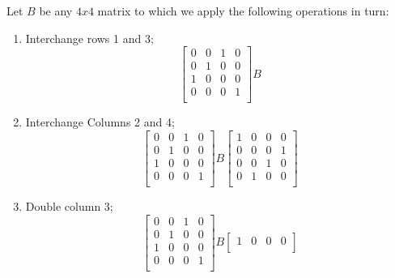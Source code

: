 \documentclass[12pt]{article}
\makeatletter
\theoremstyle{homework}
\newenvironment{exercise}[1]
{\def\@currentlabel{#1}\exercisecore}
{\endexercisecore}
\makeatother
\begin{document}
\begin{exercise}{4} Let $B$ be any $4x4$ matrix to which we apply the following operations in turn:
    \begin{enumerate}
        \item Interchange rows 1 and 3;
        \begin{equation*}
            \begin{bmatrix}
                0 & 0 & 1 & 0\\
                0 & 1 & 0 & 0\\
                1 & 0 & 0 & 0\\
                0 & 0 & 0 & 1\\
            \end{bmatrix}
            B
        \end{equation*}
        \item Interchange Columns 2 and 4;
        \begin{equation*}
            \begin{bmatrix}
                0 & 0 & 1 & 0\\
                0 & 1 & 0 & 0\\
                1 & 0 & 0 & 0\\
                0 & 0 & 0 & 1\\
            \end{bmatrix}
            B
            \begin{bmatrix}
                1 & 0 & 0 & 0\\
                0 & 0 & 0 & 1\\
                0 & 0 & 1 & 0\\
                0 & 1 & 0 & 0\\
            \end{bmatrix}
        \end{equation*}
        \item Double column 3;
        \begin{equation*}
            \begin{bmatrix}
                0 & 0 & 1 & 0\\
                0 & 1 & 0 & 0\\
                1 & 0 & 0 & 0\\
                0 & 0 & 0 & 1\\
            \end{bmatrix}
            B
            \begin{bmatrix}
                1 & 0 & 0 & 0\\

\end{bmatrix}
\end{equation*}
\end{enumerate}
\end{exercise}
\end{document}

